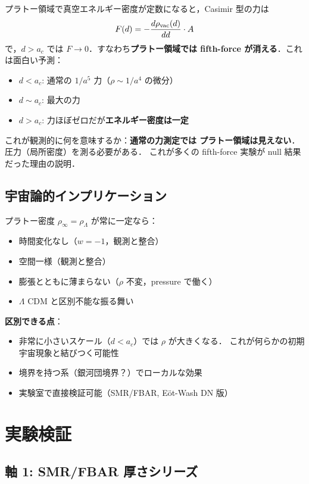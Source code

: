 \documentclass[11pt,a4paper]{article}
\begin{document}
プラトー領域で真空エネルギー密度が定数になると，Casimir 型の力は
\begin{equation}
F(d) = -\frac{d\rho_{\rm vac}(d)}{dd} \cdot A
\end{equation}
で，$d > a_c$ では $F \to 0$．すなわち\textbf{プラトー領域では
fifth-force が消える}．これは面白い予測：

\begin{itemize}
\item $d < a_c$: 通常の $1/a^5$ 力（$\rho \sim 1/a^4$ の微分）
\item $d \sim a_c$: 最大の力
\item $d > a_c$: 力ほぼゼロだが\textbf{エネルギー密度は一定}
\end{itemize}

これが観測的に何を意味するか：\textbf{通常の力測定では
プラトー領域は見えない}．圧力（局所密度）を測る必要がある．
これが多くの fifth-force 実験が null 結果だった理由の説明．

\subsection{宇宙論的インプリケーション}

プラトー密度 $\rho_\infty = \rho_\Lambda$ が常に一定なら：
\begin{itemize}
\item 時間変化なし（$w = -1$，観測と整合）
\item 空間一様（観測と整合）
\item 膨張とともに薄まらない（$\rho$ 不変，pressure で働く）
\item $\Lambda$ CDM と区別不能な振る舞い
\end{itemize}

\textbf{区別できる点}：
\begin{itemize}
\item 非常に小さいスケール（$d < a_c$）では $\rho$ が大きくなる．
これが何らかの初期宇宙現象と結びつく可能性
\item 境界を持つ系（銀河団境界？）でローカルな効果
\item 実験室で直接検証可能（SMR/FBAR, Eöt-Wash DN 版）
\end{itemize}

\section{実験検証}

\subsection{軸 1: SMR/FBAR 厚さシリーズ}
\end{document}
